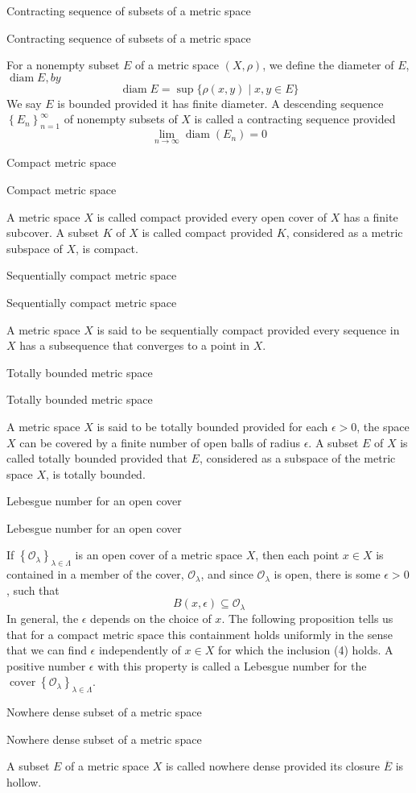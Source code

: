 \documentclass[17pt]{extarticle}
\renewcommand{\bar}[1]{\overline{#1}}
\newcommand{\boxset}[2]{\begin{mdframed}[style=darkQuesion]
#1
\end{mdframed}
\newpage
\begin{mdframed}[style=darkQuesion]
#1
  \end{mdframed}
\begin{mdframed}[style=darkAnswer]
#2
  \end{mdframed}
  \newpage
}
\begin{document}
\boxset{Contracting sequence of subsets of a metric space}
{
For a nonempty subset $E$ of a metric space $(X, \rho)$, we define the diameter of $E$, $\operatorname{diam} E, b y$
\[
\operatorname{diam} E=\sup \{\rho(x, y) \mid x, y \in E\}
\]
We say $E$ is bounded provided it has finite diameter. A descending sequence $\left\{E_{n}\right\}_{n=1}^{\infty}$ of nonempty subsets of $X$ is called a contracting sequence provided
\[
\lim _{n \rightarrow \infty} \operatorname{diam}\left(E_{n}\right)=0
\]
}%
\boxset{Compact metric space}
{
A metric space $X$ is called compact provided every open cover of $X$ has a finite subcover. A subset $K$ of $X$ is called compact provided $K$, considered as a metric subspace of $X$, is compact.
}%
\boxset{Sequentially compact metric space}
{
A metric space $X$ is said to be sequentially compact provided every sequence in $X$ has a subsequence that converges to a point in $X$.
}%
\boxset{Totally bounded metric space}
{
A metric space $X$ is said to be totally bounded provided for each $\epsilon>0$, the space $X$ can be covered by a finite number of open balls of radius $\epsilon.$ A subset $E$ of $X$ is called totally bounded provided that $E$, considered as a subspace of the metric space $X$, is totally bounded.
}%
\boxset{Lebesgue number for an open cover}
{
If $\left\{\mathcal{O}_{\lambda}\right\}_{\lambda \in \Lambda}$ is an open cover of a metric space $X$, then each point $x \in X$ is contained in a member of the cover, $\mathcal{O}_{\lambda}$, and since $\mathcal{O}_{\lambda}$ is open, there is some $\epsilon>0$, such that
\[
B(x, \epsilon) \subseteq \mathcal{O}_{\lambda}
\]
In general, the $\epsilon$ depends on the choice of $x$. The following proposition tells us that for a compact metric space this containment holds uniformly in the sense that we can find $\epsilon$ independently of $x \in X$ for which the inclusion (4) holds. A positive number $\epsilon$ with this property is called a Lebesgue number for the $\operatorname{cover}\left\{\mathcal{O}_{\lambda}\right\}_{\lambda \in \Lambda}$.
}%
\boxset{Nowhere dense subset of a metric space}
{
A subset $E$ of a metric space $X$ is called nowhere dense provided its closure $\bar{E}$ is hollow.
}
\end{document}
